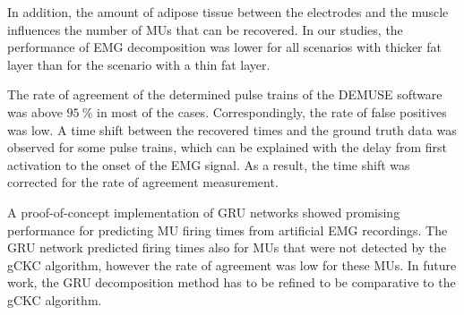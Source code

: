 In addition, the amount of adipose tissue between the electrodes and the muscle influences the number of MUs that can be recovered. In our studies, the performance of EMG decomposition was lower for all scenarios with thicker fat layer than for the scenario with a thin fat layer.

The rate of agreement of the determined pulse trains of the DEMUSE software was above $\SI{95}{\percent}$ in most of the cases. Correspondingly, the rate of false positives was low.
A time shift between the recovered times and the ground truth data was observed for some pulse trains, which can be explained with the delay from first activation to the onset of the EMG signal. As a result, the time shift was corrected for the rate of agreement measurement.

A proof-of-concept implementation of GRU networks showed promising performance for predicting MU firing times from artificial EMG recordings. 
The GRU network predicted firing times also for MUs that were not detected by the gCKC algorithm, however the rate of agreement was low for these MUs.
In future work, the GRU decomposition method has to be refined to be comparative to the gCKC algorithm.




